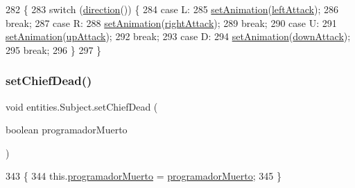\begin{DoxyCode}
282                                      \{
283         \textcolor{keywordflow}{switch} (\mbox{\hyperlink{classentities_1_1_subject_aba8c53089bb93c35ce8359d97cf99bd6}{direction}}()) \{
284             \textcolor{keywordflow}{case} L:
285                 \mbox{\hyperlink{classentities_1_1_animated_sprite_entity_a089bd746df0d8a9d5687240bb34af2dc}{setAnimation}}(\mbox{\hyperlink{classentities_1_1_subject_ab40f0af736007eb0a7ba1ee89765225a}{leftAttack}});
286                 \textcolor{keywordflow}{break};
287             \textcolor{keywordflow}{case} R:
288                 \mbox{\hyperlink{classentities_1_1_animated_sprite_entity_a089bd746df0d8a9d5687240bb34af2dc}{setAnimation}}(\mbox{\hyperlink{classentities_1_1_subject_aab2192306daae64078eba6d19699bcf0}{rightAttack}});
289                 \textcolor{keywordflow}{break};
290             \textcolor{keywordflow}{case} U:
291                 \mbox{\hyperlink{classentities_1_1_animated_sprite_entity_a089bd746df0d8a9d5687240bb34af2dc}{setAnimation}}(\mbox{\hyperlink{classentities_1_1_subject_ab5b8390d2291803a2174b7ae146f86ac}{upAttack}});
292                 \textcolor{keywordflow}{break};
293             \textcolor{keywordflow}{case} D:
294                 \mbox{\hyperlink{classentities_1_1_animated_sprite_entity_a089bd746df0d8a9d5687240bb34af2dc}{setAnimation}}(\mbox{\hyperlink{classentities_1_1_subject_a5b0e607cea5f2a64d7e7f53035995b7b}{downAttack}});
295                 \textcolor{keywordflow}{break};
296         \}
297     \}
\end{DoxyCode}
\mbox{\label{classentities_1_1_subject_a1f173d38d9133a93636087ff78975e90}} 
\subsubsection{\texorpdfstring{set\+Chief\+Dead()}{setChiefDead()}}
{\footnotesize\ttfamily void entities.\+Subject.\+set\+Chief\+Dead (\begin{DoxyParamCaption}\item[{boolean}]{programador\+Muerto }\end{DoxyParamCaption})\hspace{0.3cm}{\ttfamily [inline]}}


\begin{DoxyCode}
343                                                         \{
344         this.\mbox{\hyperlink{classentities_1_1_subject_a79362565afa5f3420bd609feb5074c78}{programadorMuerto}} = \mbox{\hyperlink{classentities_1_1_subject_a79362565afa5f3420bd609feb5074c78}{programadorMuerto}};
345     \}
\end{DoxyCode}
\mbox{\label{classentities_1_1_subject_afcd1592b3482f8ec59d577c99aa8ba25}} 
